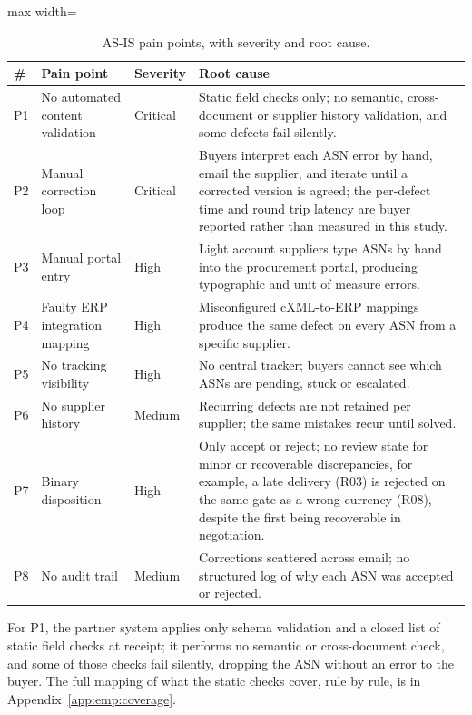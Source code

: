 \begin{table}[htbp]
\centering
\caption{AS-IS pain points, with severity and root cause.}
\label{tab:emp:painpoints}
\footnotesize
\begin{adjustbox}{max width=\textwidth}
\begin{tabular}{@{}llp{1.6cm}p{9.5cm}@{}}
\toprule
\textbf{\#} & \textbf{Pain point} & \textbf{Severity} & \textbf{Root cause} \\
\midrule
P1 & No automated content validation & Critical & Static field checks only; no semantic, cross-document or supplier history validation, and some defects fail silently. \\
P2 & Manual correction loop & Critical & Buyers interpret each ASN error by hand, email the supplier, and iterate until a corrected version is agreed; the per-defect time and round trip latency are buyer reported rather than measured in this study. \\
P3 & Manual portal entry & High & Light account suppliers type ASNs by hand into the procurement portal, producing typographic and unit of measure errors. \\
P4 & Faulty ERP integration mapping & High & Misconfigured cXML-to-ERP mappings produce the same defect on every ASN from a specific supplier. \\
P5 & No tracking visibility & High & No central tracker; buyers cannot see which ASNs are pending, stuck or escalated. \\
P6 & No supplier history & Medium & Recurring defects are not retained per supplier; the same mistakes recur until solved. \\
P7 & Binary disposition & High & Only accept or reject; no review state for minor or recoverable discrepancies, for example, a late delivery (R03) is rejected on the same gate as a wrong currency (R08), despite the first being recoverable in negotiation. \\
P8 & No audit trail & Medium & Corrections scattered across email; no structured log of why each ASN was accepted or rejected. \\
\bottomrule
\end{tabular}
\end{adjustbox}
\end{table}

For P1, the partner system applies only schema validation and a closed list of static field checks at receipt; it performs no semantic or cross-document check, and some of those checks fail silently, dropping the ASN without an error to the buyer. The full mapping of what the static checks cover, rule by rule, is in Appendix~\ref{app:emp:coverage}.


